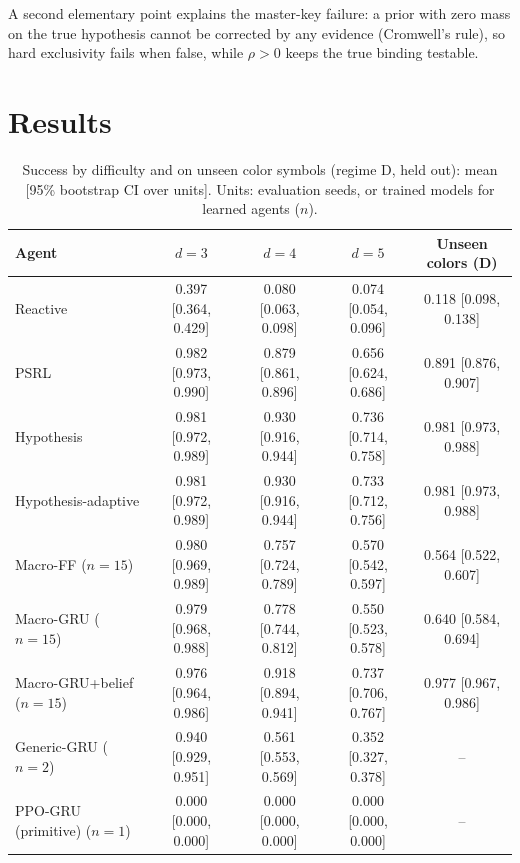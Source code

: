 \documentclass[conference]{IEEEtran}
\begin{document}
A second elementary point explains the master-key failure: a prior with zero mass on the true hypothesis cannot be corrected by any evidence (Cromwell's rule), so hard exclusivity fails when false, while $\rho>0$ keeps the true binding testable.

\section{Results}
\begin{table}[!t]
\caption{Success by difficulty and on unseen color symbols (regime D, held out): mean [95\% bootstrap CI over units]. Units: evaluation seeds, or trained models for learned agents ($n$).}\label{tab:main}
\centering\footnotesize
\begin{tabular}{lcccc}
\toprule
Agent & $d=3$ & $d=4$ & $d=5$ & Unseen colors (D) \\
\midrule
Reactive & 0.397 [0.364, 0.429] & 0.080 [0.063, 0.098] & 0.074 [0.054, 0.096] & 0.118 [0.098, 0.138] \\
PSRL & 0.982 [0.973, 0.990] & 0.879 [0.861, 0.896] & 0.656 [0.624, 0.686] & 0.891 [0.876, 0.907] \\
Hypothesis & 0.981 [0.972, 0.989] & 0.930 [0.916, 0.944] & 0.736 [0.714, 0.758] & 0.981 [0.973, 0.988] \\
Hypothesis-adaptive & 0.981 [0.972, 0.989] & 0.930 [0.916, 0.944] & 0.733 [0.712, 0.756] & 0.981 [0.973, 0.988] \\
Macro-FF ($n=15$) & 0.980 [0.969, 0.989] & 0.757 [0.724, 0.789] & 0.570 [0.542, 0.597] & 0.564 [0.522, 0.607] \\
Macro-GRU ($n=15$) & 0.979 [0.968, 0.988] & 0.778 [0.744, 0.812] & 0.550 [0.523, 0.578] & 0.640 [0.584, 0.694] \\
Macro-GRU+belief ($n=15$) & 0.976 [0.964, 0.986] & 0.918 [0.894, 0.941] & 0.737 [0.706, 0.767] & 0.977 [0.967, 0.986] \\
Generic-GRU ($n=2$) & 0.940 [0.929, 0.951] & 0.561 [0.553, 0.569] & 0.352 [0.327, 0.378] & -- \\
PPO-GRU (primitive) ($n=1$) & 0.000 [0.000, 0.000] & 0.000 [0.000, 0.000] & 0.000 [0.000, 0.000] & -- \\
\bottomrule
\end{tabular}
\end{table}
\end{document}

